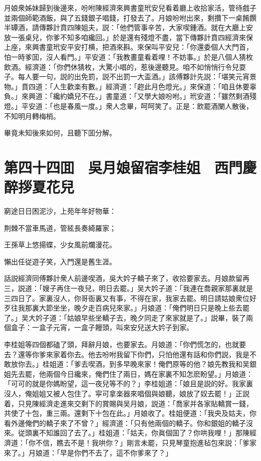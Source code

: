 月娘衆姊妹歸到後邊來，吩咐陳經濟來興書童玳安兒看着廳上收拾家活，管待戲子並兩個師範酒飯，與了五錢銀子唱錢，打發去了。月娘吩咐出來，剩攢下一桌餚饌半罈酒，請傳夥計賁四陳姐夫，説：「他們管事辛苦，大家喫鍾酒。就在大廳上安放一張桌兒，你爹不知多咱纔回。」於是還有殘燈不盡，當下傳夥計賁四經濟來保上座，來興書童玳安平安打横，把酒來斟。來保叫平安兒：「你還委個人大門首，怕一時爹囬，沒人看門。」平安道：「我教畫童看着哩！不妨事。」於是八個人猜枚飲酒。經濟道：「你們休猜枚，大驚小唱的，惹後邊聽見。咱不如悄悄行令兒耍子。每人要一句，説的出免罰，説不出罰一大盃酒。」該傅夥計先説：「堪笑元宵景物。」賁四道：「人生歡楽有數。」經濟道：「趂此月色燈光。」來保道：「咱且休要辜負。」來興道：「纔約嬌兒不在。」書童道：「又學大娘吩咐。」玳安道：「雖然剩酒殘燈。」平安道：「也是春風一度。」衆人念畢，呵呵笑了。正是：飲罷酒闌人散後，不知明月轉梅梢。

畢竟未知後來如何，且聽下囬分解。

\chapter*{第四十四囬　吳月娘留宿李桂姐　西門慶醉拶夏花兒}

窮途日日困泥沙，上苑年年好物華：

荆棘不當車馬道，管絃長奏綺羅家；

王孫草上悠揚蝶，少女風前爛漫花。

懶出任従遊子笑，入門還是舊生涯。

話説經濟同傅夥計衆人前邊喫酒，吳大妗子轎子來了，收拾要家去。月娘款留再三，説道：「嫂子再住一夜兒，明日去罷。」吴大妗子道：「我連在喬親家那裏就是三四日了。家裏沒人，你哥衙裏又有事，不得在家，我家去罷。明日請姑娘衆位好歹往我那裏大節坐坐，晚夕走百病兒來家。」月娘道：「俺們明日只是晚上些去罷了。」吴大妗子道：「姑娘早些坐轎子去，晚夕同走了來家就是了。」説畢，裝了兩個盒子：一盒子元宵，一盒子饅頭，叫來安兒送大妗子到家。

李桂姐等四個都磕了頭，拜辭月娘，也要家去。月娘道：「你們慌怎的，也就要去？還等你爹來家着你去。他去吩咐我留下你們，只怕他還有話和你們説，我是不敢放你去。」桂姐道：「爹去喫酒，到多早晚來家！俺們原等的他？娘先教我和吴銀姐先去罷，他兩個今日纔來，俺們住了兩日，媽在家裏不知怎麽盼望。」月娘道：「可可的就是你媽盼望，這一夜兒等不的？」李桂姐道：「娘且是説的好。我家裏沒人，俺姐姐又被人包住了。寜可拿楽器來唱個與娘聽，娘放了奴去罷！」正説着，只見陳經濟走進來交剩下的賞賜與吴月娘，説道：「喬家并各家貼轎賞一錢，共使了十包，重三兩。還剩下十包在此。」月娘收了。桂姐便道：「我央及姑夫，你看外邊俺們的轎子來了不曾？」經濟道：「只有他兩個的轎子。你和銀姐的轎子沒來。従頭裏不知誰回了去了。」桂姐道：「姑夫，你眞個囬了？你哄我哩！」那陳經濟道：「你不信，瞧去不是！我哄你？」剛言未罷，只見琴童抱進毡包來説：「爹家來了。」月娘道：「早是你們不去了，這不你爹來了？」

